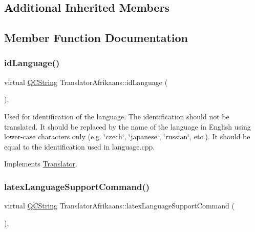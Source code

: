 \subsection*{Additional Inherited Members}


\subsection{Member Function Documentation}
\mbox{\label{class_translator_afrikaans_a787d6460f1932a4e36f42971cbe0090f}} 
\subsubsection{\texorpdfstring{idLanguage()}{idLanguage()}}
{\footnotesize\ttfamily virtual \mbox{\hyperlink{class_q_c_string}{Q\+C\+String}} Translator\+Afrikaans\+::id\+Language (\begin{DoxyParamCaption}{ }\end{DoxyParamCaption})\hspace{0.3cm}{\ttfamily [inline]}, {\ttfamily [virtual]}}

Used for identification of the language. The identification should not be translated. It should be replaced by the name of the language in English using lower-\/case characters only (e.\+g. \char`\"{}czech\char`\"{}, \char`\"{}japanese\char`\"{}, \char`\"{}russian\char`\"{}, etc.). It should be equal to the identification used in language.\+cpp. 

Implements \mbox{\hyperlink{class_translator}{Translator}}.

\mbox{\label{class_translator_afrikaans_aed6954294e76163a500f396c147ad22a}} 
\subsubsection{\texorpdfstring{latexLanguageSupportCommand()}{latexLanguageSupportCommand()}}
{\footnotesize\ttfamily virtual \mbox{\hyperlink{class_q_c_string}{Q\+C\+String}} Translator\+Afrikaans\+::latex\+Language\+Support\+Command (\begin{DoxyParamCaption}{ }\end{DoxyParamCaption})\hspace{0.3cm}{\ttfamily [inline]}, {\ttfamily [virtual]}}

